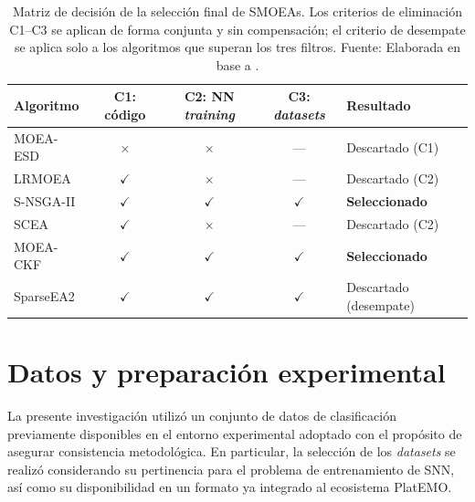 \begin{table}[htbp]
    \centering
    \small
    \caption{Matriz de decisión de la selección final de SMOEAs. Los criterios de eliminación C1--C3 se aplican de forma conjunta y sin compensación; el criterio de desempate se aplica solo a los algoritmos que superan los tres filtros. Fuente: Elaborada en base a \cite{8065138_platEMO}.}
    \begin{tabular}{lccc l}
    \hline
         \textbf{Algoritmo}&  \textbf{C1: código}&  \textbf{C2: NN \textit{training}}&  \textbf{C3: \textit{datasets}}&  \textbf{Resultado}\\ \hline
         MOEA-ESD&  $\times$&  $\times$&  ---&  Descartado (C1)\\
         LRMOEA&  $\checkmark$&  $\times$&  ---&  Descartado (C2)\\
         S-NSGA-II&  $\checkmark$&  $\checkmark$&  $\checkmark$&  \textbf{Seleccionado}\\
         SCEA&  $\checkmark$&  $\times$&  ---&  Descartado (C2)\\
         MOEA-CKF&  $\checkmark$&  $\checkmark$&  $\checkmark$&  \textbf{Seleccionado}\\
         SparseEA2&  $\checkmark$&  $\checkmark$&  $\checkmark$&  Descartado (desempate)\\ \hline
    \end{tabular}
    \label{tab:algo_seleccion_final}
\end{table}




\section{Datos y preparación experimental}\label{sec:datos-preparacion}
La presente investigación utilizó un conjunto de datos de clasificación previamente disponibles en el entorno experimental adoptado con el propósito de asegurar consistencia metodológica. En particular, la selección de los \textit{datasets} se realizó considerando su pertinencia para el problema de entrenamiento de SNN, así como su disponibilidad en un formato ya integrado al ecosistema PlatEMO.

